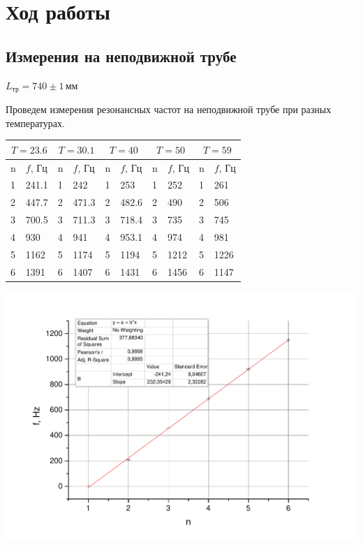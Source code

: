 \documentclass[a4paper,12pt]{article}
\begin{document}
		\section{Ход работы}
		\subsection{Измерения на неподвижной трубе}
		$L_{\text{тр}}=740\pm1\,\text{мм}$
		
		Проведем измерения резонансных частот на неподвижной трубе при разных температурах.
		\begin{center}
			\begin{tabular}{ l | l | l | l | l | l | l | l | l | l }
				\multicolumn{2}{c}{$T = 23.6$} & \multicolumn{2}{|c}{$T = 30.1$} & \multicolumn{2}{|c}{$T = 40$} & \multicolumn{2}{|c}{$T = 50$} & \multicolumn{2}{|c}{$T = 59$}\\ \hline
				n & $f$, Гц & n & $f$, Гц & n & $f$, Гц & n & $f$, Гц & n & $f$, Гц \\ \hline
				1 & 241.1 & 1 & 242 & 1 & 253 & 1 & 252  & 1 & 261 \\ \hline
				2 & 447.7 & 2 & 471.3 & 2 & 482.6 & 2 & 490 & 2 & 506  \\ \hline
				3 & 700.5 & 3 & 711.3 & 3 & 718.4 & 3 & 735 & 3 & 745  \\ \hline
				4 & 930 & 4 & 941 & 4 & 953.1 & 4 & 974 & 4 & 981  \\ \hline
				5 & 1162 & 5 & 1174 & 5 & 1194 & 5 & 1212 & 5 & 1226  \\ \hline
				6 & 1391 & 6 & 1407 & 6 & 1431 & 6 & 1456 & 6 & 1147  \\ \hline
			\end{tabular}
		\end{center}
		
		\includegraphics[width = 0.9\linewidth]{Graph1gr}
		
\end{document}
